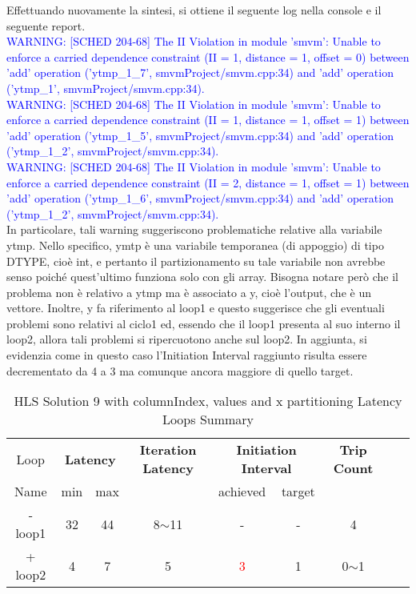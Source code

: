 

Effettuando nuovamente la sintesi, si ottiene il seguente log nella console e il seguente report.
\\
\textcolor{blue}{WARNING: [SCHED 204-68] The II Violation in module 'smvm': Unable to enforce a carried dependence constraint (II = 1, distance = 1, offset = 0)
	between 'add' operation ('ytmp\_1\_7', smvmProject/smvm.cpp:34) and 'add' operation ('ytmp\_1', smvmProject/smvm.cpp:34).}
\\
\textcolor{blue}{WARNING: [SCHED 204-68] The II Violation in module 'smvm': Unable to enforce a carried dependence constraint (II = 1, distance = 1, offset = 1)
	between 'add' operation ('ytmp\_1\_5', smvmProject/smvm.cpp:34) and 'add' operation ('ytmp\_1\_2', smvmProject/smvm.cpp:34).}
\\
\textcolor{blue}{WARNING: [SCHED 204-68] The II Violation in module 'smvm': Unable to enforce a carried dependence constraint (II = 2, distance = 1, offset = 1)
	between 'add' operation ('ytmp\_1\_6', smvmProject/smvm.cpp:34) and 'add' operation ('ytmp\_1\_2', smvmProject/smvm.cpp:34).}
\\

In particolare, tali warning suggeriscono problematiche relative alla variabile ytmp. Nello specifico, ymtp è una variabile temporanea (di appoggio) di tipo DTYPE, cioè int, e pertanto il partizionamento su tale variabile non avrebbe senso poiché quest'ultimo funziona solo con gli array. Bisogna notare però che il problema non è relativo a ytmp ma è associato a y, cioè l'output, che è un vettore. Inoltre, y fa riferimento al loop1 e questo suggerisce che gli eventuali problemi sono relativi al ciclo1 ed, essendo che il loop1 presenta al suo interno il loop2, allora tali problemi si ripercuotono anche sul loop2. In aggiunta, si evidenzia come in questo caso l'Initiation Interval raggiunto risulta essere decrementato da 4 a 3 ma comunque ancora maggiore di quello target. 

\begin{table}[H]
	\centering
	\begin{tabular}{|c|c|c|c|c|c|c|c|c|}
		\hline
		\multicolumn{1}{|c|}{Loop} & \multicolumn{2}{|c|}{\textbf{Latency}} & \multicolumn{1}{c|}{\textbf{Iteration Latency}} & \multicolumn{2}{c|}{\textbf{Initiation Interval}} & \multicolumn{1}{c|}{\textbf{Trip Count}}  \\
		Name & min & max &  & achieved & target &  \\
		\hline
		- loop1 & 32 & 44 & 8$\sim$11 & - & - & 4 \\
		+ loop2 & 4 & 7 & 5 & \textcolor{red}{3} & 1 & 0$\sim$1 \\
		\hline
	\end{tabular}
	\caption{HLS Solution 9 with columnIndex, values and x partitioning Latency Loops Summary}
	\label{tab:hls-solution-9-columnindex-values-partitioning-loop-summary}
\end{table}

